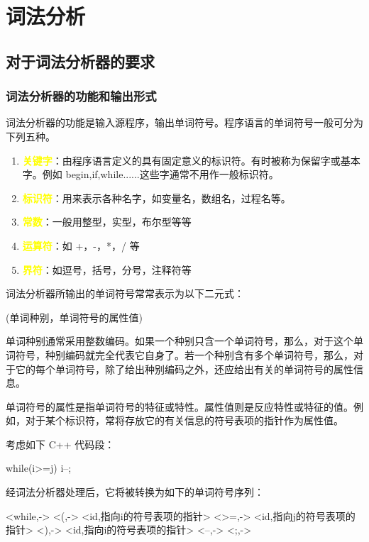 \section{词法分析}
\subsection{对于词法分析器的要求}
\subsubsection{词法分析器的功能和输出形式}

词法分析器的功能是输入源程序，输出单词符号。程序语言的单词符号一般可分为下列五种。

\begin{enumerate}
    \item \textbf{\textcolor{mark}{关键字}}：由程序语言定义的具有固定意义的标识符。有时被称为保留字或基本字。例如 begin,if,while......这些字通常不用作一般标识符。
    \item \textbf{\textcolor{mark}{标识符}}：用来表示各种名字，如变量名，数组名，过程名等。
    \item \textbf{\textcolor{mark}{常数}}：一般用整型，实型，布尔型等等
    \item \textbf{\textcolor{mark}{运算符}}：如 +，-，*，/ 等
    \item \textbf{\textcolor{mark}{界符}}：如逗号，括号，分号，注释符等
\end{enumerate}

词法分析器所输出的单词符号常常表示为以下二元式：
\begin{center}
    (单词种别，单词符号的属性值)
\end{center}

单词种别通常采用整数编码。如果一个种别只含一个单词符号，那么，对于这个单词符号，种别编码就完全代表它自身了。若一个种别含有多个单词符号，那么，对于它的每个单词符号，除了给出种别编码之外，还应给出有关的单词符号的属性信息。

单词符号的属性是指单词符号的特征或特性。属性值则是反应特性或特征的值。例如，对于某个标识符，常将存放它的有关信息的符号表项的指针作为属性值。

考虑如下 C++ 代码段：
\begin{center}
    while(i>=j) i--;
\end{center}

经词法分析器处理后，它将被转换为如下的单词符号序列：
\begin{center}
    \begin{code}
        <while,->
        <(,->
        <id,指向i的符号表项的指针>
        <>=,->
        <id,指向j的符号表项的指针>
        <),->
        <id,指向i的符号表项的指针>
        <--,->
        <;,->
    \end{code}
\end{center}

